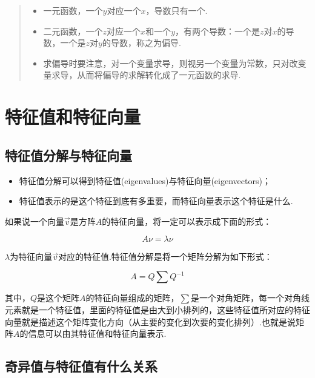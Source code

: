 \begin{quote}
\begin{itemize}
 
\item
  一元函数，一个\(y\)对应一个\(x\)，导数只有一个.\\
\item
  二元函数，一个\(z\)对应一个\(x\)和一个\(y\)，有两个导数：一个是\(z\)对\(x\)的导数，一个是\(z\)对\(y\)的导数，称之为偏导.\\
\item
  求偏导时要注意，对一个变量求导，则视另一个变量为常数，只对改变量求导，从而将偏导的求解转化成了一元函数的求导.
\end{itemize}
\end{quote}

\section{特征值和特征向量}\label{ux7279ux5f81ux503cux548cux7279ux5f81ux5411ux91cf}

\subsection{特征值分解与特征向量}\label{ux7279ux5f81ux503cux5206ux89e3ux4e0eux7279ux5f81ux5411ux91cf}

\begin{itemize}
\item
  特征值分解可以得到特征值(eigenvalues)与特征向量(eigenvectors)；
\item
  特征值表示的是这个特征到底有多重要，而特征向量表示这个特征是什么.
\end{itemize}

如果说一个向量\(\vec{v}\)是方阵\(A\)的特征向量，将一定可以表示成下面的形式：

\[
A\nu = \lambda \nu
\]

\(\lambda\)为特征向量\(\vec{v}\)对应的特征值.特征值分解是将一个矩阵分解为如下形式：

\[
A=Q\sum Q^{-1}
\]

其中，\(Q\)是这个矩阵\(A\)的特征向量组成的矩阵，\(\sum\)是一个对角矩阵，每一个对角线元素就是一个特征值，里面的特征值是由大到小排列的，这些特征值所对应的特征向量就是描述这个矩阵变化方向（从主要的变化到次要的变化排列）.也就是说矩阵\(A\)的信息可以由其特征值和特征向量表示.

\subsection{奇异值与特征值有什么关系}\label{ux5947ux5f02ux503cux4e0eux7279ux5f81ux503cux6709ux4ec0ux4e48ux5173ux7cfb}

